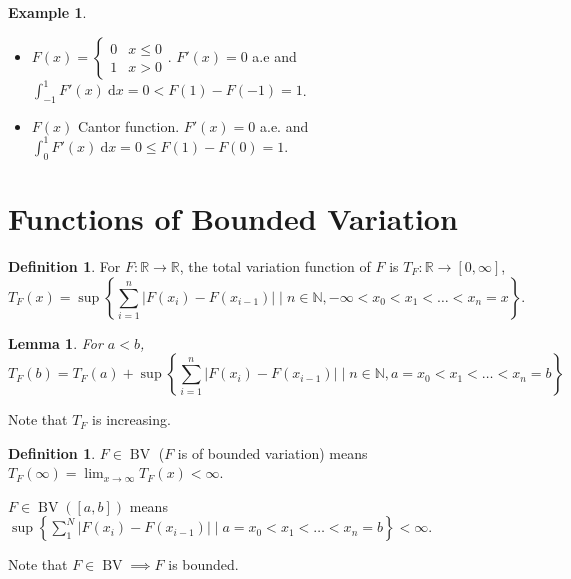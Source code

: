 \documentclass{report}
\newcommand{\R}{\mathbb{R}}
\newcommand{\N}{\mathbb{N}}
\def \BV {\operatorname{BV}}
\newcommand{\df}{\ \mathrm{d}}
\newtheorem{lemma}[theorem]{Lemma}
\theoremstyle{definition}
\newtheorem{definition}[theorem]{Definition}
\newtheorem{example}[theorem]{Example}
\theoremstyle{remark}
\newcommand{\fnl}{\parbox[t]{0\linewidth}{}}
\begin{document}
\begin{example}\fnl
	\begin{itemize}
		\item $F(x) = \begin{cases}
			0 & x \leq 0 \\
			1 & x > 0
		\end{cases}$. $F'(x) = 0$ a.e and $\displaystyle \int_{-1}^1 F'(x) \df x = 0 < F(1) - F(-1) = 1$.
		\item $F(x)$ Cantor function. $F'(x) = 0$ a.e. and $\displaystyle \int_0^1 F'(x)\df x = 0 \leq F(1) - F(0) = 1$.
	\end{itemize}
\end{example}

\section{Functions of Bounded Variation}
\begin{definition}
	For $F: \R \to \R$, the total variation function of $F$ is $T_F: \R \to [0, \infty]$, \[
		T_F(x) = \sup\left\{\sum_{i=1}^n |F(x_i) - F(x_{i-1})| \mid n \in \N, -\infty < x_0 < x_1 < \ldots < x_n = x\right\}.
	\]
\end{definition}
\begin{lemma}
	For $a < b$, \[
		T_F(b) = T_F(a) + \sup\left\{\sum_{i=1}^n |F(x_i) - F(x_{i-1})| \mid n \in \N, a = x_0 < x_1 < \ldots < x_n = b\right\}
	\]
\end{lemma}
Note that $T_F$ is increasing.

\begin{definition}
	$F \in \BV$ ($F$ is of bounded variation) means $T_F(\infty) = \lim_{x \to \infty}T_F(x) < \infty$. 

	$F \in \BV([a, b])$ means $\sup\left\{\sum_{1}^N |F(x_i) - F(x_{i-1})| \mid a = x_0 < x_1 < \ldots < x_n = b\right\} < \infty$.
\end{definition}
Note that $F \in \BV \implies F$ is bounded.
\end{document}
